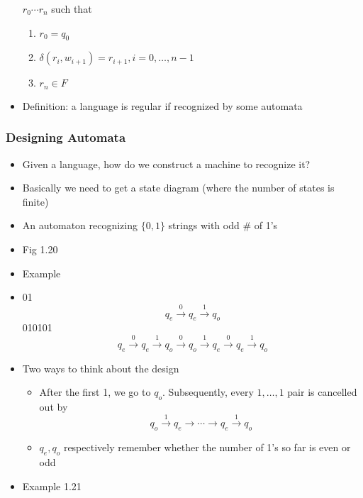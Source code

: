 \begin{frame}[allowframebreaks]
\begin{itemize}
 $r_0 \cdots r_n$ such that
  \begin{enumerate}
  \item $r_0 = q_0$
  \item $\delta(r_i, w_{i+1})= r_{i+1}, i = 0, \ldots, n-1$
  \item $r_n \in F$
  \end{enumerate}
\item \alert{Definition}:
  a language is regular if recognized by some automata
\end{itemize}\end{frame} \begin{frame}[allowframebreaks] \frametitle{Designing Automata}
  \begin{itemize}
\item Given a language, how do we construct a machine to recognize it?
\item Basically we need to get a state diagram (where the number
  of states is finite)
\item An automaton recognizing $\{0,1\}$ strings with odd
\# of 1's 

\item []Fig 1.20

\begin{center}
    \end{center}
\item Example

\item [] 01
  \begin{equation*}
    q_e \xrightarrow{0} q_e \xrightarrow{1} q_o
  \end{equation*}
  010101
  \begin{equation*}
    q_e \xrightarrow{0} q_e \xrightarrow{1} q_o
    \xrightarrow{0} q_o \xrightarrow{1} q_e \xrightarrow{0} q_e
    \xrightarrow{1} q_o
  \end{equation*}
  
\item Two ways to think about the design
  \begin{itemize}
  \item After the first 1, we go to $q_o$. Subsequently, every $1, \ldots, 1$ pair is cancelled out by
  \begin{equation*}
q_o \xrightarrow{1} q_e \rightarrow \cdots \rightarrow q_e
    \xrightarrow{1} q_o
  \end{equation*}
\item $q_e, q_o$ respectively remember whether the number of 1's
  so far is even or odd
  \end{itemize}
\item Example 1.21
  

\end{itemize}
\end{frame}
